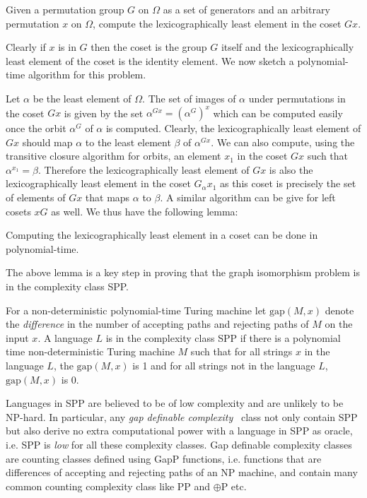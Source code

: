 \documentclass{article}
\begin{document}
\begin{problem}
  Given a permutation group $G$ on $\Omega$ as a set of generators and
  an arbitrary permutation $x$ on $\Omega$, compute the
  lexicographically least element in the coset $Gx$.
\end{problem}

Clearly if $x$ is in $G$ then the coset is the group $G$ itself and
the lexicographically least element of the coset is the identity
element. We now sketch a polynomial-time algorithm for this problem.

Let $\alpha$ be the least element of $\Omega$. The set of images of
$\alpha$ under permutations in the coset $Gx$ is given by the set
$\alpha^{Gx} = (\alpha^G)^x$ which can be computed easily once the
orbit $\alpha^G$ of $\alpha$ is computed. Clearly, the
lexicographically least element of $Gx$ should map $\alpha$ to the
least element $\beta$ of $\alpha^{Gx}$. We can also compute, using the
transitive closure algorithm for orbits, an element $x_1$ in the coset
$Gx$ such that $\alpha^{x_1} = \beta$. Therefore the lexicographically
least element of $Gx$ is also the lexicographically least element in
the coset $G_\alpha x_1$ as this coset is precisely the set of
elements of $Gx$ that maps $\alpha$ to $\beta$. A similar algorithm
can be give for left cosets $xG$ as well. We thus have the following
lemma:

\begin{lemma}
  Computing the lexicographically least element in a coset can be done
  in polynomial-time.
\end{lemma}

The above lemma is a key step in proving that the graph isomorphism
problem is in the complexity class SPP.

\begin{definition}[SPP]
  For a non-deterministic polynomial-time Turing machine let
  $\mathrm{gap}(M,x)$ denote the \emph{difference} in the number of
  accepting paths and rejecting paths of $M$ on the input $x$.  A
  language $L$ is in the complexity class \textrm{SPP} if there is a
  polynomial time non-deterministic Turing machine $M$ such that for
  all strings $x$ in the language $L$, the $\mathrm{gap}(M,x)$ is 1
  and for all strings not in the language $L$, $\mathrm{gap}(M,x)$ is
  0.
\end{definition}

Languages in SPP are believed to be of low complexity and are unlikely
to be NP-hard. In particular, any \emph{gap definable
  complexity}~\cite{fenner91gapdefinable} class not only contain SPP
but also derive no extra computational power with a language in SPP as
oracle, i.e. SPP is \emph{low} for all these complexity classes. Gap
definable complexity classes~\cite{fenner91gapdefinable} are counting
classes defined using GapP functions, i.e. functions that are
differences of accepting and rejecting paths of an NP machine, and
contain many common counting complexity class like PP and
$\oplus\mathrm{P}$ etc.
\end{document}
